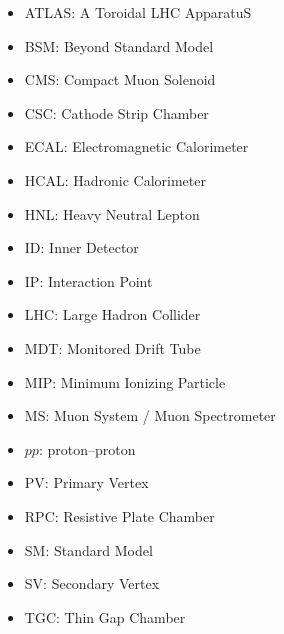 \begin{itemize}
    \item ATLAS: A Toroidal LHC ApparatuS
    \item BSM: Beyond Standard Model
    \item CMS: Compact Muon Solenoid
    \item CSC: Cathode Strip Chamber
    \item ECAL: Electromagnetic Calorimeter
    \item HCAL: Hadronic Calorimeter
    \item HNL: Heavy Neutral Lepton
    \item ID: Inner Detector
    \item IP: Interaction Point
    \item LHC: Large Hadron Collider
    \item MDT: Monitored Drift Tube
    \item MIP: Minimum Ionizing Particle
    \item MS: Muon System / Muon Spectrometer
    \item $pp$: proton--proton
    \item PV: Primary Vertex
    \item RPC: Resistive Plate Chamber
    \item SM: Standard Model
    \item SV: Secondary Vertex
    \item TGC: Thin Gap Chamber
\end{itemize}